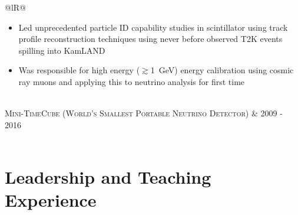 \documentclass[10pt]{article} %
\begin{document}
\begin{tabularx}{\linewidth}{@{}lR@{}}
{\begin{minipage}[t]{\linewidth}
\begin{itemize}
				detection technique in scintillator and demonstrated with data
				for the first time that this can be applied to conduct indirect
				dark matter searches in scintillator; first ever physics
				application of neutrino directionality in scintillator
			\item Led unprecedented particle ID capability studies in
				scintillator using track profile reconstruction techniques
				using never before observed T2K events spilling into KamLAND
			\item Was responsible for high energy
				($\gtrsim$\SI{1}{\giga\electronvolt}) energy calibration using
				cosmic ray muons and applying this to neutrino analysis for
				first time
		\end{itemize}
	\end{minipage}}\\
	\textsc{Mini-TimeCube (World's Smallest Portable Neutrino Detector)} & \textsc{2009 - 2016}\\
	\\
\end{tabularx}


\section{Leadership and Teaching Experience}
\end{document}
